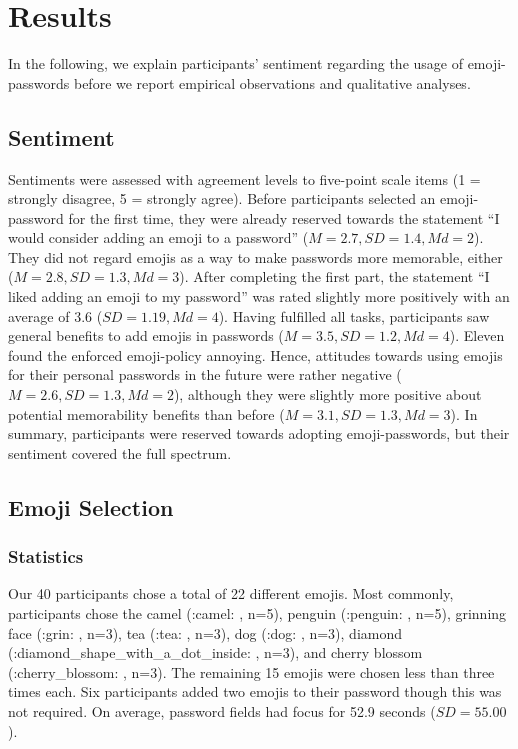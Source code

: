\section{Results}
In the following, we explain participants' sentiment regarding the usage of emoji-passwords before we report empirical observations and qualitative analyses. 
\subsection{Sentiment}
Sentiments were assessed with agreement levels to five-point scale items (1 = strongly disagree, 5 = strongly agree).
Before participants selected an emoji-password for the first time, they were already reserved towards the statement ``I would consider adding an emoji to a password'' ($M=2.7, SD = 1.4, Md=2$). They did not regard emojis as a way to make passwords more memorable, either ($M=2.8, SD = 1.3, Md=3$).
After completing the first part, the statement ``I liked adding an emoji to my password'' was rated slightly more positively with an average of 3.6 ($SD=1.19, Md=4$). 
Having fulfilled all tasks, participants saw general benefits to add emojis in passwords ($M=3.5, SD = 1.2, Md=4$). Eleven found the enforced emoji-policy annoying. Hence, attitudes towards using emojis for their personal passwords in the future were rather negative ($M=2.6, SD = 1.3, Md=2$), although they were slightly more positive about potential memorability benefits than before ($M=3.1, SD = 1.3, Md=3$). In summary, participants were reserved towards adopting emoji-passwords, but their sentiment covered the full spectrum. 

\subsection{Emoji Selection}
\subsubsection{Statistics}
Our 40 participants chose a total of 22 different emojis. Most commonly, participants chose the camel (:camel: , n=5), penguin (:penguin: , n=5), grinning face (:grin: , n=3), tea (:tea: , n=3), dog (:dog: , n=3), diamond (:diamond\_shape\_with\_a\_dot\_inside: , n=3), and cherry blossom (:cherry\_blossom: , n=3). The remaining 15 emojis were chosen less than three times each. Six participants added two emojis to their password though this was not required. On average, password fields had focus for 52.9 seconds ($SD = 55.00$).

